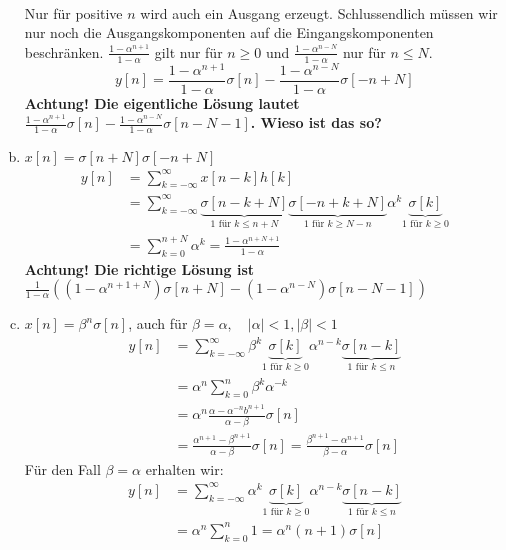 \begin{enumerate}[a)]
\begin{align*}
			\end{align*}
			Nur für positive $n$ wird auch ein Ausgang erzeugt. Schlussendlich müssen wir nur noch die  Ausgangskomponenten auf die Eingangskomponenten beschränken. $\frac{1-\alpha ^{n+1}}{1-\alpha} $ gilt nur für $n\ge 0$ und $\frac{1-\alpha^{n-N}}{1-\alpha}$ nur für $n\le N$.
			\[
				y[n]	= \frac{1-\alpha ^{n+1}}{1-\alpha}\sigma[n]-\frac{1-\alpha^{n-N}}{1-\alpha}\sigma[-n+N]
			\]
			\textbf{Achtung! Die eigentliche Lösung lautet $\frac{1-\alpha ^{n+1}}{1-\alpha}\sigma[n]-\frac{1-\alpha^{n-N}}{1-\alpha}\sigma[n-N-1]$. Wieso ist das so?}
		\item $x[n]=\sigma [n+N]\sigma [-n+N]$
			\begin{align*}
				y[n]	&= \sum_{k=-\infty}^{\infty}x[n-k]h[k] \\
						&= \sum_{k=-\infty}^{\infty}\underbrace{\sigma[n-k+N]}_{1 \text{ für } k\le n+N}\underbrace{\sigma[-n+k+N]}_{1 \text{ für } k\ge N-n} \alpha^{k}\underbrace{\sigma[k]}_{1 \text{ für } k\ge 0} \\
						&= \sum_{k=0}^{n+N} \alpha^{k} = \frac{1-\alpha^{n+N+1}}{1-\alpha}
			\end{align*}
			\textbf{Achtung! Die richtige Lösung ist\\ $\frac{1}{1-\alpha}((1-\alpha^{n+1+N})\sigma[n+N]-(1-\alpha^{n-N})\sigma[n-N-1])$}
		\item $x[n]=\beta ^n \sigma [n]$, auch für $\beta = \alpha, \quad |\alpha|<1, |\beta| < 1$
			\begin{align*}
				y[n]	&= \sum_{k=-\infty}^{\infty} \beta^k \underbrace{\sigma[k]}_{1 \text{ für } k\ge 0}\alpha^{n-k} \underbrace{\sigma[n-k]}_{1 \text{ für } k \le n} \\
						&= \alpha^n \sum_{k=0}^{n} \beta^k \alpha^{-k} \\
						&= \alpha^n \frac{\alpha-\alpha^{-n}b^{n+1}}{\alpha-\beta}\sigma[n] \\
						&= \frac{\alpha^{n+1}-\beta^{n+1}}{\alpha-\beta}\sigma[n] = \frac{\beta^{n+1}-\alpha^{n+1}}{\beta-\alpha}\sigma[n]
			\end{align*}
			Für den Fall $\beta = \alpha$ erhalten wir:
			\begin{align*}
				y[n]	&=  \sum_{k=-\infty}^{\infty} \alpha^k \underbrace{\sigma[k]}_{1 \text{ für } k\ge 0}\alpha^{n-k} \underbrace{\sigma[n-k]}_{1 \text{ für } k \le n} \\
						&= \alpha^n \sum_{k=0}^{n}1 = \alpha^n (n+1) \sigma[n]
			\end{align*}
	\end{enumerate}